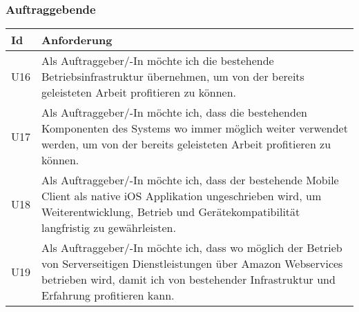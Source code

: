 \subsubsection{Auftraggebende}

\begin{table}[h]
    \centering
    \begin{tabular}{|l|p{15cm}|}
        \hline
        \textbf{Id} & \textbf{Anforderung}                                                                                                                                                                          \\
        \hline
        U16         & Als Auftraggeber/-In möchte ich die bestehende Betriebsinfrastruktur übernehmen, um von der bereits geleisteten Arbeit profitieren zu können.                                                     \\
        \hline
        U17         & Als Auftraggeber/-In möchte ich, dass die bestehenden Komponenten des Systems wo immer möglich weiter verwendet werden, um von der bereits geleisteten Arbeit profitieren zu können.               \\
        \hline
        U18         & Als Auftraggeber/-In möchte ich, dass der bestehende Mobile Client als native iOS Applikation ungeschrieben wird, um Weiterentwicklung, Betrieb und Gerätekompatibilität langfristig zu gewährleisten.                            \\
        \hline
        U19         & Als Auftraggeber/-In möchte ich, dass wo möglich der Betrieb von Serverseitigen Dienstleistungen über Amazon Webservices betrieben wird, damit ich von bestehender Infrastruktur und Erfahrung profitieren kann. \\
        \hline
    \end{tabular}\label{tab:userstories3}
\end{table}

